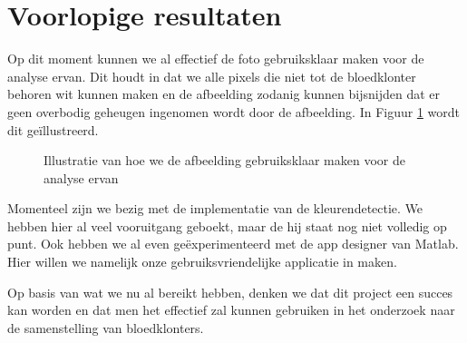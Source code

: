 \documentclass[a4paper,kulak]{kulakarticle}
\begin{document}
	

	\section{Voorlopige resultaten}		
		Op dit moment kunnen we al effectief de foto gebruiksklaar maken voor de analyse ervan. Dit houdt in dat we alle pixels die niet tot de bloedklonter behoren wit kunnen maken en de afbeelding zodanig kunnen bijsnijden dat er geen overbodig geheugen ingenomen wordt door de afbeelding. In Figuur \ref{fig: voorna} wordt dit geïllustreerd.
	
		\begin{figure}[H]
			\centering
			\qquad
		
			\caption{Illustratie van hoe we de afbeelding gebruiksklaar maken voor de analyse ervan}
			\label{fig: voorna}
		\end{figure}
	
		Momenteel zijn we bezig met de implementatie van de kleurendetectie. We hebben hier al veel vooruitgang geboekt, maar de hij staat nog niet volledig op punt. Ook hebben we al even geëxperimenteerd met de app designer van Matlab. Hier willen we namelijk onze gebruiksvriendelijke applicatie in maken.
	
		Op basis van wat we nu al bereikt hebben, denken we dat dit project een succes kan worden en dat men het effectief zal kunnen gebruiken in het onderzoek naar de samenstelling van bloedklonters.
	
\end{document}

